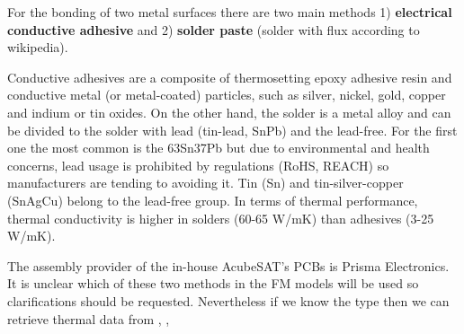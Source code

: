 \documentclass[final]{cubedoc}
\begin{document}
	For the bonding of two metal surfaces there are two main methods 1) \textbf{electrical conductive adhesive} and 2) \textbf{solder paste} (solder with flux according to wikipedia). 
	
	
	Conductive adhesives are a composite of thermosetting epoxy adhesive resin and conductive metal (or metal-coated) particles, such as silver, nickel, gold, copper and indium or tin oxides. On the other hand, the solder is a metal alloy and can be divided to the solder with lead (tin-lead, SnPb) and the lead-free. For the first one the most common is the 63Sn37Pb but due to environmental and health concerns, lead usage is prohibited by regulations (RoHS, REACH) so manufacturers are tending to avoiding it. Tin (Sn) and tin-silver-copper (SnAgCu) belong to the lead-free group. In terms of thermal performance, thermal conductivity is higher in solders (60-65 W/mK) than adhesives (3-25 W/mK)\cite{leadvssolde}. 
	
	The assembly provider of the in-house AcubeSAT's PCBs is Prisma Electronics. It is unclear which of these two methods in the FM models will be used so clarifications should be requested. Nevertheless if we know the type then we can retrieve thermal data from \cite{solder},  \cite{wiki:solderalloys}, \cite{propemetalengedge}
	
	
	
	
\end{document}

